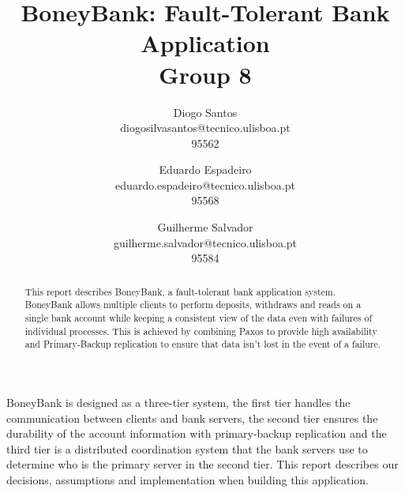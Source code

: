 \documentclass[times, 10pt,twocolumn]{article}
\begin{document}
\title{
BoneyBank: Fault-Tolerant Bank Application \\
\large Group 8
}

\author{
Diogo Santos\\diogosilvasantos@tecnico.ulisboa.pt\\95562\\
\and
Eduardo Espadeiro\\eduardo.espadeiro@tecnico.ulisboa.pt\\95568\\
\and
Guilherme Salvador\\guilherme.salvador@tecnico.ulisboa.pt\\95584\\
}

\maketitle
\thispagestyle{empty}

\begin{abstract}
   This report describes BoneyBank, a fault-tolerant bank application system. BoneyBank allows multiple clients to perform deposits, withdraws and reads on a single bank account while keeping a consistent view of the data even with failures of individual processes. This is achieved by combining Paxos to provide high availability and Primary-Backup replication to ensure that data isn’t lost in the event of a failure.
\end{abstract}


BoneyBank is designed as a three-tier system, the first tier handles the communication between clients and bank servers, the second tier ensures the durability of the account information with primary-backup replication and the third tier is a distributed coordination system that the bank servers use to determine who is the primary server in the second tier.
This report describes our decisions, assumptions and implementation when building this application.


\end{document}
